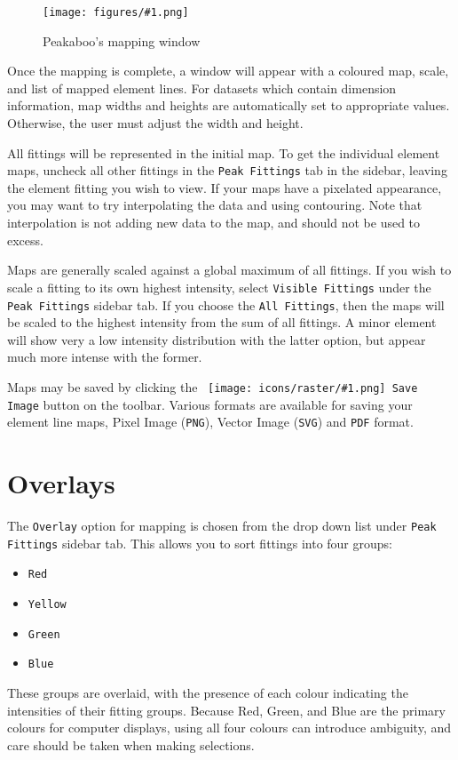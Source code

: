 \documentclass[article,twoside,11pt]{report}
\newcommand{\command}[1]{\texttt{#1}}
\newcommand{\icon}[1]{\texttt{[image: icons/raster/\#1.png]}}
\newcommand{\button}[2]{\ \command{\icon{#1} #2}}
\newcommand{\screenshot}[2]{%
\begin{figure}[h!]
\centering\texttt{[image: figures/\#1.png]}
\caption{#2}
\end{figure}
}
\newcommand{\tocsection}[1]{\section*{#1}\addcontentsline{toc}{section}{#1}}
\begin{document}
\screenshot{map-window}{Peakaboo's mapping window}

Once the mapping is complete, a window will appear with a coloured map, scale, and list of mapped element lines. For datasets which contain dimension information, map widths and heights are automatically set to appropriate values. Otherwise, the user must adjust the width and height. 

All fittings will be represented in the initial map. To get the individual element maps, uncheck all other fittings in the \command{Peak Fittings} tab in the sidebar, leaving the element fitting you wish to view. If your maps have a pixelated appearance, you may want to try interpolating the data and using contouring. Note that interpolation is not adding new data to the map, and should not be used to excess.

Maps are generally scaled against a global maximum of all fittings. If you wish to scale a fitting to its own highest intensity, select \command{Visible Fittings} under the \command{Peak Fittings} sidebar tab. If you choose the \command{All Fittings}, then the maps will be scaled to the highest intensity from the sum of all fittings. A minor element will show very a low intensity distribution with the latter option, but appear much more intense with the former.

Maps may be saved by clicking the \button{device-camera}{Save Image} button on the toolbar. Various formats are available for saving your element line maps, Pixel Image (\command{PNG}), Vector Image (\command{SVG}) and \command{PDF} format.


\tocsection{Overlays}

The \command{Overlay} option for mapping is chosen from the drop down list under \command{Peak Fittings} sidebar tab. This allows you to sort fittings into four groups: 

\begin{itemize}[topsep=4pt,itemsep=1pt,partopsep=0pt, parsep=0pt]
\item \command{Red}
\item \command{Yellow}
\item \command{Green}
\item \command{Blue}
\end{itemize}

These groups are overlaid, with the presence of each colour indicating the intensities of their fitting groups. Because Red, Green, and Blue are the primary colours for computer displays, using all four colours can introduce ambiguity, and care should be taken when making selections.
\end{document}
